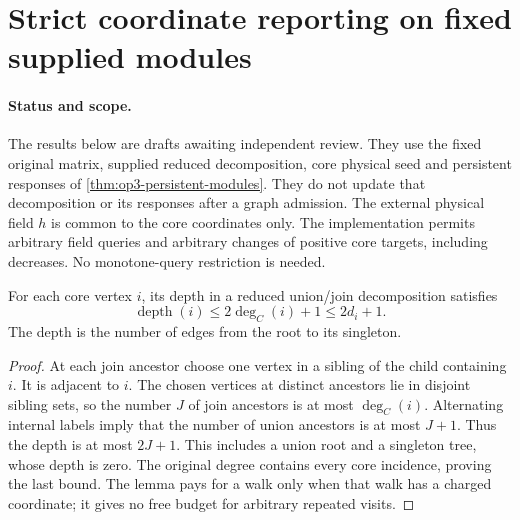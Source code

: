 \section[Fixed-module coordinate reporter]{Strict coordinate reporting on fixed supplied modules}
\label{sec:op3-module-reporter}

\paragraph{Status and scope.}
The results below are \statusproved{} drafts awaiting independent review.
They use the fixed original matrix, supplied reduced decomposition, core
physical seed and persistent responses of
\cref{thm:op3-persistent-modules}. They do not update that decomposition or
its responses after a graph admission. The external physical field $h$ is
common to the core coordinates only. The implementation permits arbitrary
field queries and arbitrary changes of positive core targets, including
decreases. No monotone-query restriction is needed.

\begin{lemma}
\label{lem:op3-module-weighted-depth}
For each core vertex $i$, its depth in a reduced union/join decomposition
satisfies
\begin{equation}
 \operatorname{depth}(i)\leq 2\deg_C(i)+1\leq 2d_i+1.
 \label{eq:op3-module-weighted-depth}
\end{equation}
The depth is the number of edges from the root to its singleton.
\end{lemma}
\begin{proof}
At each join ancestor choose one vertex in a sibling of the child
containing $i$. It is adjacent to $i$. The chosen vertices at distinct
ancestors lie in disjoint sibling sets, so the number $J$ of join ancestors
is at most $\deg_C(i)$. Alternating internal labels imply that the number
of union ancestors is at most $J+1$. Thus the depth is at most $2J+1$.
This includes a union root and a singleton tree, whose depth is zero.
The original degree contains every core incidence, proving the last bound.
The lemma pays for a walk only when that walk has a charged coordinate;
it gives no free budget for arbitrary repeated visits.
\end{proof}


